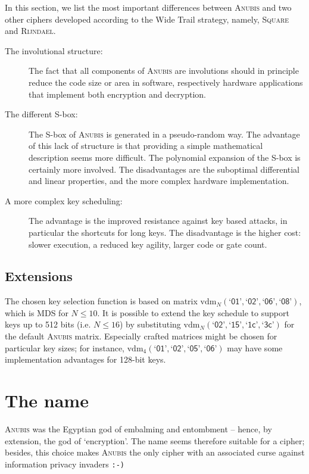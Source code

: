 \documentclass{llncs}
\newcommand{\vdm}{\mathrm{vdm}}
\newcommand{\gf}[1]{\textsf{`#1'}}
\begin{document}
In this section, we list the most important differences between
\textsc{Anubis} and two other ciphers developed according to the
Wide Trail strategy, namely, \textsc{\mbox{Square}} and
\textsc{\mbox{Rijndael}}.
\begin{description}
\item[The involutional structure:] The fact that all components
of \textsc{Anubis} are involutions should in principle reduce the code
size or area in software, respectively hardware applications
that implement both encryption and decryption.
\item[The different S-box:] The S-box of \textsc{Anubis} is
generated in a pseudo-random way. The advantage of this lack of
structure is that providing a simple mathematical description seems
more difficult. The polynomial expansion of the S-box is certainly
more involved. The disadvantages are the suboptimal differential
and linear properties, and the more complex hardware implementation.
\item[A more complex key scheduling:]
The advantage is the improved resistance against key
based attacks, in particular the shortcuts for long keys.
The disadvantage is the higher cost:
slower execution, a reduced key agility, larger code or
gate count.
\end{description}

\subsection{Extensions}

The chosen key selection function is based on matrix
$\vdm_N(\gf{01}, \gf{02}, \gf{06}, \gf{08})$, which is MDS for $N
\leqslant 10$. It is possible to extend the key schedule to
support keys up to 512 bits (i.e. $N \leqslant 16$) by
substituting $\vdm_N(\gf{02}, \gf{15}, \gf{1c}, \gf{3c})$ for the
default \textsc{Anubis} matrix. Especially crafted matrices might
be chosen for particular key sizes; for instance, $\vdm_4(\gf{01},
\gf{02}, \gf{05}, \gf{06})$ may have some implementation
advantages for 128-bit keys.

\section{The name}

\textsc{Anubis} was the Egyptian god of embalming and entombment
-- hence, by extension, the god of `encryption'.  The name seems
therefore suitable for a cipher; besides, this choice makes
\textsc{Anubis} the only cipher with an associated curse against
information privacy invaders \verb!:-)!
\end{document}
